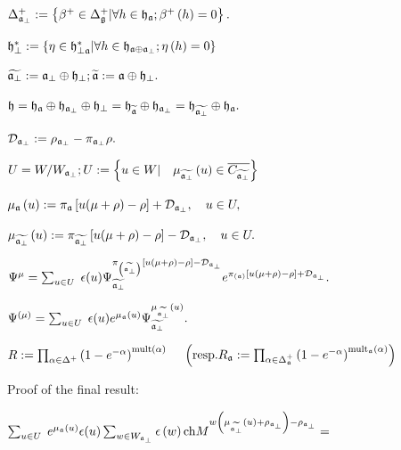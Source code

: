 \documentclass[12pt]{article}
\theoremstyle{definition}
\begin{document}
$\Delta _{\frak{a}_{\perp }}^{+}:=\left\{ \beta ^{+}\in \Delta _{\frak{g}%
}^{+}|\forall h\in \frak{h}_{\frak{a}};\beta ^{+}\left( h\right) =0\right\}
. $

$\frak{h}_{\perp }^{\ast }:=\left\{ \eta \in \frak{h}_{\perp \frak{a}}^{\ast
}|\forall h\in \frak{h}_{\frak{a}\oplus \frak{a}_{\perp }};\eta \left(
h\right) =0\right\} $

$\widetilde{\frak{a}_{\perp }}:=\frak{a}_{\perp }\oplus \frak{h}_{\perp };%
\widetilde{\frak{a}}:=\frak{a}\oplus \frak{h}_{\perp }.$

$\frak{h}=\frak{\frak{h}_{\frak{a}}}\oplus \frak{h}_{\frak{a}_{\perp
}}\oplus \frak{h}_{\perp }=\frak{\frak{h}_{\widetilde{\frak{a}}}}\oplus
\frak{h}_{\frak{a}_{\perp }}=\frak{\frak{h}_{\widetilde{\frak{a}_{\perp }}}}%
\oplus \frak{h}_{\frak{a}}.$

$\mathcal{D}_{\frak{a}_{\perp }}:=\rho _{\frak{a}_{\perp }}-\pi _{\frak{a}%
_{\perp }}\rho .$

$U=W/W_{\frak{a}_{\perp }};U:=\left\{ u\in W|\quad \mu _{\widetilde{\frak{a}%
_{\perp }}}\left( u\right) \in \overline{C_{\widetilde{\frak{a}_{\perp }}}}%
\right\} $

$\mu _{\frak{a}}\left( u\right) :=\pi _{\frak{a}}\left[ u(\mu +\rho )-\rho %
\right] +\mathcal{D}_{\frak{a}_{\perp }},\quad u\in U,$

$\mu _{\widetilde{\frak{a}_{\perp }}}\left( u\right) :=\pi _{\widetilde{%
\frak{a}_{\perp }}}\left[ u(\mu +\rho )-\rho \right] -\mathcal{D}_{\frak{a}%
_{\perp }},\quad u\in U.$

$\Psi ^{\mu }=\sum_{u\in U}\;\epsilon (u)\Psi _{\widetilde{\frak{a}_{\perp }}%
}^{\pi _{\left( \widetilde{\frak{a}_{\perp }}\right) }\left[ u(\mu +\rho
)-\rho \right] -\mathcal{D}_{\frak{a}_{\perp }}}e^{\pi _{\left( \frak{a}%
\right) }\left[ u(\mu +\rho )-\rho \right] +\mathcal{D}_{\frak{a}_{\perp
}}}. $

$\Psi ^{\left( \mu \right) }=\sum_{u\in U}\;\epsilon (u)e^{\mu _{\frak{a}%
}\left( u\right) }\Psi _{\widetilde{\frak{a}_{\perp }}}^{\mu _{\widetilde{%
\frak{a}_{\perp }}}\left( u\right) }.$

$R:=\prod_{\alpha \in \Delta ^{+}}\left( 1-e^{-\alpha }\right) ^{\mathrm{{%
mult}\left( \alpha \right) }}\quad $ $\left( \mathrm{resp.}R_{\frak{a}%
}:=\prod_{\alpha \in \Delta _{\frak{a}}^{+}}\left( 1-e^{-\alpha }\right) ^{%
\mathrm{mult}_{\frak{a}}\mathrm{\left( \alpha \right) }}\right) $

Proof of the final result:

$\sum_{u\in U}\;e^{\mu _{\frak{a}}\left( u\right) }\epsilon (u)\sum_{w\in W_{%
\frak{a}_{\perp }}}\epsilon \left( w\right) \mathrm{ch}M^{w\left( \mu _{%
\widetilde{\frak{a}_{\perp }}}\left( u\right) +\rho _{\frak{a}_{\perp
}}\right) -\rho _{\frak{a}_{\perp }}}=$
\end{document}
